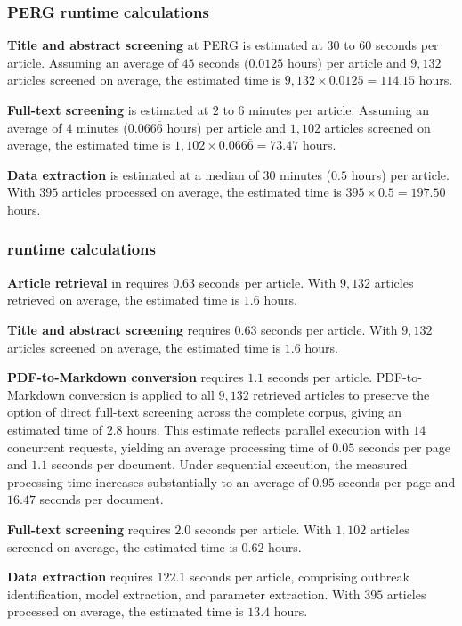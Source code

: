 \subsubsection*{PERG runtime calculations} 
\textbf{Title and abstract screening} at PERG is estimated at $30$ to $60$ seconds per article. Assuming an average of $45$ seconds ($0.0125$ hours) per article and $9{,}132$ articles screened on average, the estimated time is $9{,}132 \times 0.0125 = 114.15$ hours. 

\textbf{Full-text screening} is estimated at $2$ to $6$ minutes per article. Assuming an average of $4$ minutes ($0.066\overline{6}$ hours) per article and $1{,}102$ articles screened on average, the estimated time is $1{,}102 \times 0.066\overline{6} = 73.47$ hours. 

\textbf{Data extraction} is estimated at a median of $30$ minutes ($0.5$ hours) per article. With $395$ articles processed on average, the estimated time is $395 \times 0.5 = 197.50$ hours.


\subsubsection*{\name{} runtime calculations}
\textbf{Article retrieval} in \name{} requires $0.63$ seconds per article. With $9{,}132$ articles retrieved on average, the estimated time is $1.6$ hours.

\textbf{Title and abstract screening} requires $0.63$ seconds per article. With $9{,}132$ articles screened on average, the estimated time is $1.6$ hours.

\textbf{PDF-to-Markdown conversion} requires $1.1$ seconds per article. PDF-to-Markdown conversion is applied to all $9{,}132$ retrieved articles to preserve the option of direct full-text screening across the complete corpus, giving an estimated time of $2.8$ hours. This estimate reflects parallel execution with $14$ concurrent requests, yielding an average processing time of $0.05$ seconds per page and $1.1$ seconds per document. Under sequential execution, the measured processing time increases substantially to an average of $0.95$ seconds per page and $16.47$ seconds per document.

\textbf{Full-text screening} requires $2.0$ seconds per article. With $1{,}102$ articles screened on average, the estimated time is $0.62$ hours.

\textbf{Data extraction} requires $122.1$ seconds per article, comprising outbreak identification, model extraction, and parameter extraction. With $395$ articles processed on average, the estimated time is $13.4$ hours.


